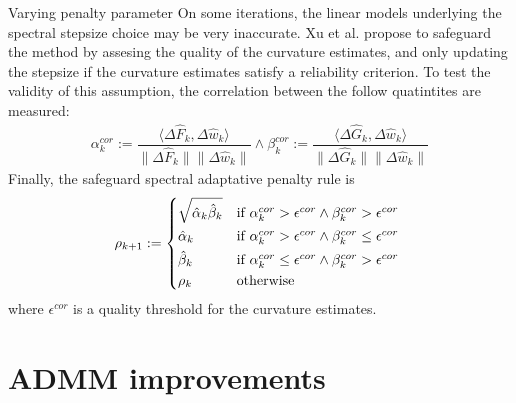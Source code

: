\documentclass[8pt,red]{beamer}
\theoremstyle{plain}
\theoremstyle{definition}
\theoremstyle{remark}
\begin{document}
\begin{frame}{Varying penalty parameter}
On some iterations, the linear models underlying the spectral stepsize choice may be very inaccurate. Xu et al. propose to safeguard the method by assesing the quality of the curvature estimates, and only updating the stepsize if the curvature estimates satisfy a reliability criterion. To test the validity of this assumption, the correlation between the follow quatintites are measured:
\begin{align}
  \alpha_{k}^{cor} := \dfrac{\langle \Delta \hat{F}_{k} , \Delta \hat{w}_{k} \rangle}{ \|\Delta \hat{F}_{k}\|  \|\Delta \hat{w}_{k}\|}
  \wedge
  \beta_{k}^{cor} := \dfrac{\langle \Delta \hat{G}_{k} , \Delta \hat{w}_{k} \rangle}{ \|\Delta \hat{G}_{k}\|  \|\Delta \hat{w}_{k}\|}  
\end{align}
Finally, the safeguard spectral adaptative penalty rule is
\begin{align}
  \rho_{k+1} := 
  \begin{dcases*}
	\sqrt{\hat{\alpha}_{k} \hat{\beta}_{k}}
    & if $ \alpha_{k}^{cor} > \epsilon^{cor} \wedge \beta_{k}^{cor} > \epsilon^{cor} $ \\
    \hat{\alpha}_{k}
    & if $ \alpha_{k}^{cor} > \epsilon^{cor} \wedge \beta_{k}^{cor} \leq \epsilon^{cor} $ \\
    \hat{\beta}_{k}
    & if $ \alpha_{k}^{cor} \leq \epsilon^{cor} \wedge \beta_{k}^{cor} > \epsilon^{cor} $ \\
    \rho_{k}
    & otherwise \\
  \end{dcases*} 
\end{align}
where $\epsilon^{cor}$ is a quality threshold for the curvature estimates.
\end{frame}

\section{ADMM improvements}
\end{document}
